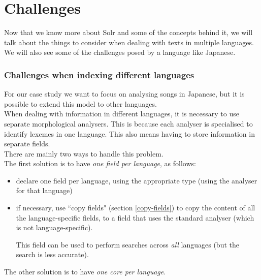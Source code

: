 

\renewcommand{\currentPart}{Challenges}
\part{\currentPart}  \label{part - Challenges}

Now that we know more about Solr and some of the concepts behind it, we will talk about the things to consider when dealing with texts in multiple languages. We will also see some of the challenges posed by a language like Japanese.


\section{Challenges when indexing different languages}

For our case study we want to focus on analysing songs in Japanese, but it is possible to extend this model to other languages. \\

When dealing with information in different languages, it is necessary to use separate morphological analysers. This is because each analyser is specialised to identify lexemes in one language. This also means having to store information in separate fields. \\

There are mainly two ways to handle this problem. \\

The first solution is to have \emph{one field per language}, as follows:
\begin{itemize}
	\item declare one field per language, using the appropriate type (using the analyser for that language)
	
	\item if necessary, use ``copy ﬁelds" (section \ref{copy-fields}) to copy the content of all the language-specific fields, to a field that uses the standard analyser (which is not language-specific).
	
	This field can be used to perform searches across \emph{all} languages (but the search is less accurate).
\end{itemize}


\bigskip

The other solution is to have \emph{one core per language}. \\


